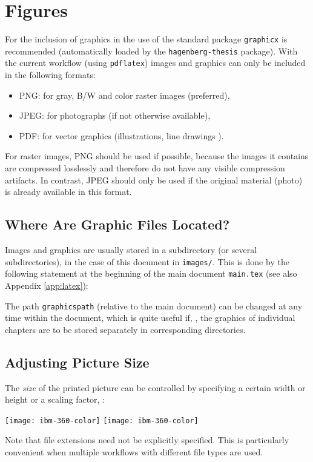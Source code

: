 \section{Figures}

For the inclusion of graphics in \latex the use of the
standard package \texttt{graphicx} \cite{Carlisle2024} is recommended
(automatically loaded by the \texttt{hagenberg-thesis} package).
With the current workflow (using \texttt{pdflatex}) images and graphics
can only be included in the following formats:
%
\begin{itemize}
    \item PNG: for gray, B/W and color raster images (preferred),
    \item JPEG: for photographs (if not otherwise available),
    \item PDF: for vector graphics (illustrations, line drawings \etc).
\end{itemize}
%
For raster images, PNG should be used if possible, because the images it
contains are compressed losslessly and therefore do not have any visible
compression artifacts. In contrast, JPEG should only be used if the original
material (photo) is already available in this format.


\subsection{Where Are Graphic Files Located?}

Images and graphics are usually stored in a subdirectory (or several
subdirectories), in the case of this document in \nolinkurl{images/}. This is
done by the following statement at the beginning of the main document
\nolinkurl{main.tex} (see also Appendix \ref{app:latex}):
%
\begin{GenericCode}[numbers=none]
\graphicspath{{images/}}
\end{GenericCode}
%
The path \texttt{graphicspath} (relative to the main document) can be changed
at any time within the document, which is quite useful if, \eg, the graphics
of individual chapters are to be stored separately in corresponding directories.


\subsection{Adjusting Picture Size}

The \emph{size} of the printed picture can be controlled by specifying a
certain width or height or a scaling factor, \eg:
%
\begin{GenericCode}[numbers=none]
\texttt{[image: ibm-360-color]}
\texttt{[image: ibm-360-color]}
\end{GenericCode}
%
Note that file extensions need not be explicitly specified.
This is particularly convenient when multiple workflows with different file
types are used.


